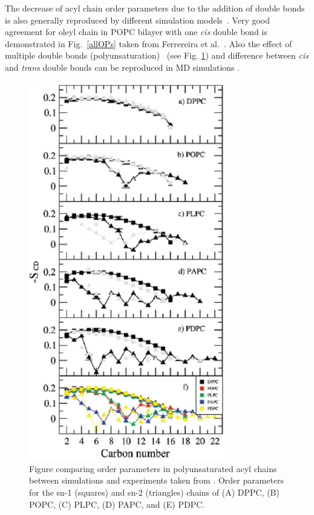 \documentclass[aps,prl,superscriptaddress,twocolumn]{revtex4}
\begin{document}
The decrease of acyl chain order parameters due to the addition of double bonds is also 
generally reproduced by different simulation 
models~\cite{hyvonen97,hyvonen97b,hyvonen05,ollila07a,dickson12,klauda10,ferreira13,jambeck13,lee14,dickson14}. 
Very good agreement for oleyl chain in POPC bilayer with one {\it cis} double bond is demonstrated in Fig.~\ref{allOPs} 
taken from Ferrereira et al.~\cite{ferreira13}.
Also the effect of multiple double bonds (polyunsaturation)~\cite{hyvonen97,hyvonen97b,hyvonen05,ollila07a,??} (see Fig. \ref{polyunsat})
and difference between {\it cis} and {\it trans} double bonds can be reproduced in MD simulations \cite{kulig15b}.
\begin{figure}[]
  \includegraphics[width=8.6cm]{../Fig/polyunsat.eps}
\newline
  \caption{\label{polyunsat}
   Figure comparing order parameters in polyunsaturated acyl chains between simulations and 
   experiments taken from \cite{ollila07a}.
   Order parameters for the sn-1 (squares) and sn-2 (triangles)
   chains of (A) DPPC, (B) POPC, (C) PLPC, (D) PAPC, and (E) PDPC.
}
\end{figure}
\end{document}
